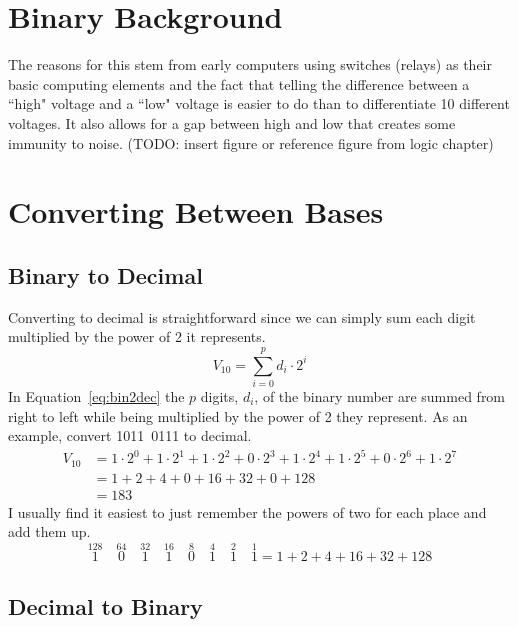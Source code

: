 \section{Binary Background}
The reasons for this stem from early computers 
using switches (relays) as their basic computing elements and the fact that telling the 
difference between a ``high" voltage and a ``low" voltage is easier to do than to differentiate
10 different voltages. It also allows for a gap between high and low that creates some 
immunity to noise. (TODO: insert figure or reference figure from logic chapter) 

\section{Converting Between Bases}
\subsection{Binary to Decimal}
Converting to decimal is straightforward since we can simply sum each digit multiplied by the 
power of 2 it represents. 
\begin{equation}
	\label{eq:bin2dec}
	V_{10} = \sum_{i=0}^p d_i \cdot 2^i
\end{equation}
In Equation~\ref{eq:bin2dec} the $p$ digits, $d_i$, of the binary number are summed from right 
to left while being multiplied by the power of 2 they represent. As an example, convert 
1011~0111 to decimal.
\begin{equation}
	\begin{split}
	V_{10} &= 1\cdot2^0 + 1\cdot2^1 + 1\cdot2^2 + 0\cdot2^3 + 1\cdot2^4 + 1\cdot2^5 + 0\cdot2^6 + 1\cdot2^7\\
		&= 1 + 2 + 4 + 0 + 16 + 32 + 0 + 128\\
		&= 183
	\end{split}
\end{equation}
I usually find it easiest to just remember the powers of two for each place and add them up.
\begin{equation}
	\overset{128}{1}\quad\overset{64}{0}\quad\overset{32}{1}\quad\overset{16}{1}\quad\overset{8}{0}\quad
	\overset{4}{1}\quad\overset{2}{1}\quad\overset{1}{1} = 1 + 2 + 4 + 16 + 32 + 128
\end{equation}

\subsection{Decimal to Binary}

